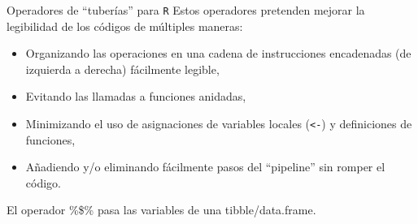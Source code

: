 \documentclass[
  ignorenonframetext,
  aspectratio=169]{beamer}
\newenvironment{Shaded}{\begin{snugshade}}{\end{snugshade}}
\newcommand{\FunctionTok}[1]{\textcolor[rgb]{0.13,0.29,0.53}{\textbf{#1}}}
\newcommand{\NormalTok}[1]{#1}
\newcommand{\SpecialCharTok}[1]{\textcolor[rgb]{0.81,0.36,0.00}{\textbf{#1}}}
\begin{document}
\begin{frame}[fragile]{Operadores de ``tuberías'' para \texttt{R}}
\label{operadores-de-tuberuxedas-para-r-1}
Estos operadores pretenden mejorar la legibilidad de los códigos de
múltiples maneras:

\begin{itemize}
\item
  Organizando las operaciones en una cadena de instrucciones encadenadas
  (de izquierda a derecha) fácilmente legible,
\item
  Evitando las llamadas a funciones anidadas,
\item
  Minimizando el uso de asignaciones de variables locales
  (\texttt{\textless{}-}) y definiciones de funciones,
\item
  Añadiendo y/o eliminando fácilmente pasos del ``pipeline'' sin romper
  el código.
\end{itemize}

El operador \%\$\% pasa las variables de una tibble/data.frame.

\begin{Shaded}
\end{Shaded}
\end{frame}
\end{document}
